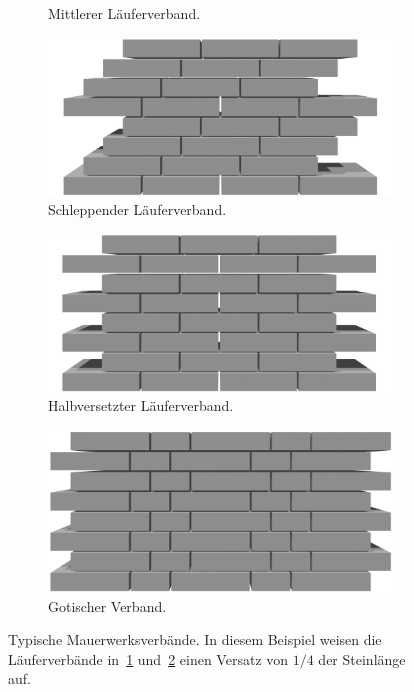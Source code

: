 \begin{figure}[htb]
\begin{subfigure}[b]{0.4\columnwidth}
    \caption{Mittlerer Läuferverband.}\label{fig:basics:verbaende_c}
  \end{subfigure}
  \hfill
  \begin{subfigure}[b]{0.4\columnwidth}
    \includegraphics[width=\columnwidth]{fig/basics_stretchedbond25_schleppend}
    \caption{Schleppender Läuferverband.}\label{fig:basics:verbaende_d}
  \end{subfigure}
  \hspace*{\fill}%
  \begin{subfigure}[b]{0.4\columnwidth}
    \includegraphics[width=\columnwidth]{fig/basics_stretchedbond50.png}
    \caption{Halbversetzter Läuferverband.}
  \end{subfigure}
  \hfill
  \begin{subfigure}[b]{0.4\columnwidth}
    \includegraphics[width=\columnwidth]{fig/basics_gothicbond.png}
    \caption{Gotischer Verband.}
  \end{subfigure}
  \caption{Typische Mauerwerksverbände. In diesem Beispiel weisen die Läuferverbände in~\ref{fig:basics:verbaende_c} und~\ref{fig:basics:verbaende_d} einen Versatz von \(1/4\) der Steinlänge auf.}\label{fig:basics:verbaende}
\end{figure}
